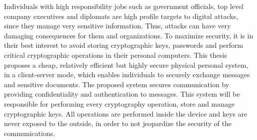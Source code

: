 \noindent Individuals with high responsibility jobs such as government officials, top level company executives and diplomats are high profile targets to digital attacks, since they manage very sensitive information. Thus, attacks can have very damaging consequences for them and organizations. To maximize security, it is in their best interest to avoid storing cryptographic keys, passwords and perform critical cryptographic operations in their personal computers. This thesis proposes a cheap, relatively efficient but highly secure physical personal system, in a client-server mode, which enables individuals to securely exchange messages and sensitive documents. The proposed system secures communication by providing confidentiality and authentication to messages. This system will be responsible for performing every cryptography operation, store and manage cryptographic keys. All operations are performed inside the device and keys are never exposed to the outside, in order to not jeopardize the security of the communications.
